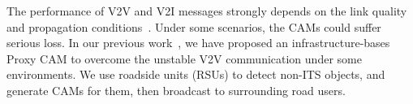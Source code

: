 The performance of V2V and V2I messages strongly depends on the link quality and propagation conditions~\cite{shagdar2012experimentation}.
Under some scenarios, the CAMs could suffer serious loss.
In our previous work~\cite{kitazato2016proxy}, we have proposed an infrastructure-bases Proxy CAM to overcome the unstable V2V communication under some environments.
We use roadside units (RSUs) to detect non-ITS objects, and generate CAMs for them, then broadcast to surrounding road users.
